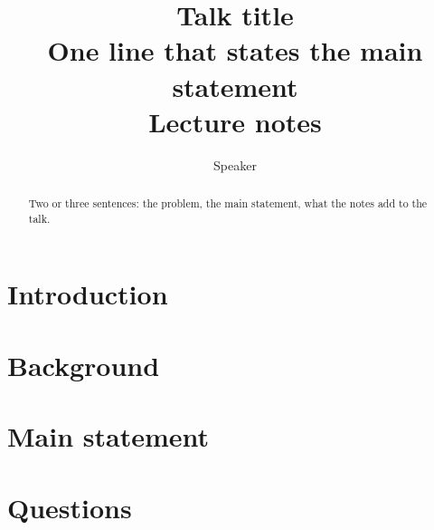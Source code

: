 \documentclass[11pt]{article}
\title{Talk title\\[0.3em]\large One line that states the main statement\\[0.3em]\normalsize Lecture notes}
\author{Speaker}
\date{}
\begin{document}
\maketitle
\begin{abstract}
\noindent Two or three sentences: the problem, the main statement, what the notes add to the talk.
\end{abstract}
\tableofcontents

\section{Introduction}\label{sec:intro}


\section{Background}\label{sec:bg}


\section{Main statement}\label{sec:main}




\section{Questions}\label{sec:end}



\end{document}
